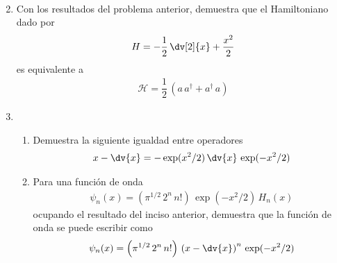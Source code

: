\begin{enumerate}
\begin{align*}
\end{align*}
\item Con los resultados del problema anterior, demuestra que el Hamiltoniano dado por
\begin{align*}
H = - \dfrac{1}{2} \, \dv[2]{x} + \dfrac{x^{2}}{2}
\end{align*}
es equivalente a
\begin{align*}
\mathcal{H} = \dfrac{1}{2} \, \left( a \, a^{\dagger} + a^{\dagger} \, a \right)
\end{align*}
\item 
\begin{enumerate}
\item Demuestra la siguiente igualdad entre operadores
\begin{align*}
x - \dv{x} = - \exp(x^{2}/2) \, \dv{x} \, \exp(-x^{2}/2)
\end{align*}
\item Para una función de onda
\begin{align*}
\psi_{n} (x) = \left( \pi^{1/2} \, 2^{n} \, n! \right) \, \exp(-x^{2}/2) \, H_{n} (x)
\end{align*}
ocupando el resultado del inciso anterior, demuestra que la función de onda se puede escribir como
\begin{align*}
\psi_{n} (x) = \left( \pi^{1/2} \, 2^{n} \, n! \right) \, \left( x - \dv{x} \right)^{n} \, \exp(-x^{2}/2) 
\end{align*}
\end{enumerate}
\end{enumerate}
